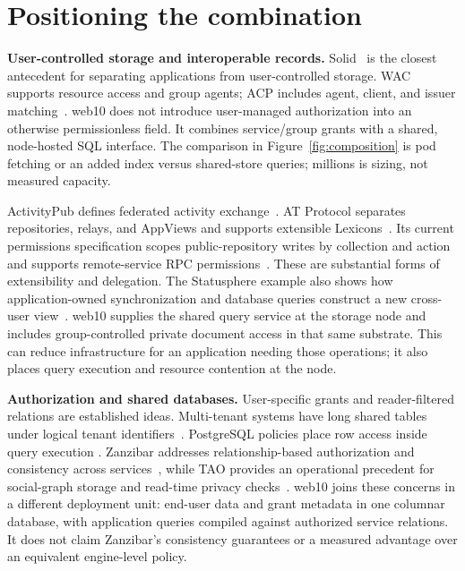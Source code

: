 \documentclass[sigconf, nonacm]{acmart}
\begin{document}


\section{Positioning the combination}
\label{sec:related}

\textbf{User-controlled storage and interoperable records.}
Solid~\cite{solid2016,solid-apps2016,css2024} is the closest antecedent
for separating applications from user-controlled storage. WAC supports
resource access and group agents; ACP includes agent, client, and issuer
matching~\cite{wac2022,acp2022}. web10 does not introduce user-managed
authorization into an otherwise permissionless field. It combines
service/group grants with a shared, node-hosted SQL interface. The
comparison in Figure~\ref{fig:composition} is pod fetching or an added
index versus shared-store queries; millions is sizing, not measured capacity.

ActivityPub defines federated activity exchange~\cite{activitypub2018}.
AT Protocol separates repositories, relays, and AppViews and supports
extensible Lexicons~\cite{kleppmann2024}. Its current permissions
specification scopes public-repository writes by collection and action
and supports remote-service RPC permissions~\cite{at-permissions}.
These are substantial forms of extensibility and delegation. The
Statusphere example also shows how application-owned synchronization
and database queries construct a new cross-user view~\cite{at-statusphere}.
web10 supplies the shared query service at the storage node and includes
group-controlled private document access in that same substrate. This
can reduce infrastructure for an application needing those operations;
it also places query execution and resource contention at the node.

\textbf{Authorization and shared databases.}
User-specific grants and reader-filtered relations are established
ideas. Multi-tenant systems have long shared tables under logical
tenant identifiers~\cite{force2009,aulbach2008,jacobs2007}.
PostgreSQL policies place row access inside query execution
\cite{postgres-rls}. Zanzibar addresses relationship-based authorization
and consistency across services~\cite{zanzibar2019}, while TAO provides
an operational precedent for social-graph storage and read-time privacy
checks~\cite{tao2013}. web10 joins these concerns in a different
deployment unit: end-user data and grant metadata in one columnar
database, with application queries compiled against authorized service
relations. It does not claim Zanzibar's consistency guarantees or a
measured advantage over an equivalent engine-level policy.
\end{document}
